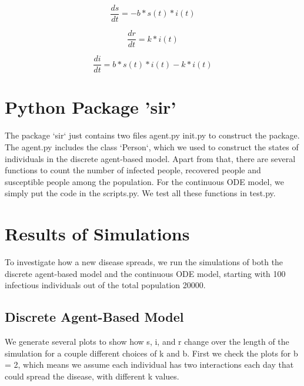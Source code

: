 \documentclass{article}
\begin{document}
$$\frac{ds}{dt} = -b * s(t) * i(t)$$

$$\frac{dr}{dt} = k * i(t)$$

$$\frac{di}{dt} = b * s(t) * i(t) - k * i(t)$$




\section{Python Package 'sir'}
The package `sir` just contains two files  agent.py init.py to construct the package. The agent.py includes the class `Person`, which we used to construct the states of individuals in the discrete agent-based model. Apart from that, there are several functions to count the number of infected people, recovered people and susceptible people among the population. For the continuous ODE model, we simply put the code in the scripts.py. We test all these functions in test.py.










\section{Results of Simulations}

To investigate how a new disease spreads, we run the simulations of both the discrete agent-based model and the continuous ODE model, starting with 100 infectious individuals out of the total population 20000.




\subsection{Discrete Agent-Based Model}

We generate several plots to show how s, i, and r change over the length of the simulation for a couple different choices of k and b. First we check the plots for b = 2, which means we assume each individual has two interactions each day that could spread the disease, with different k values.
\end{document}
